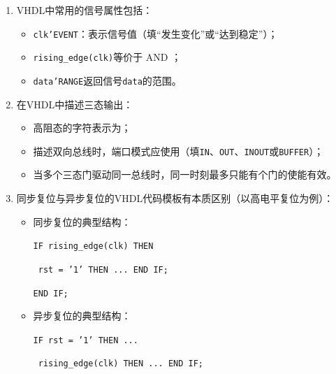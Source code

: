 \begin{enumerate}[label=\arabic*.]

\item VHDL中常用的信号属性包括：
\begin{itemize}
  \item \texttt{clk'EVENT}：表示信号值\underline{\hspace{3cm}}（填“发生变化”或“达到稳定”）；
  \item \texttt{rising\_edge(clk)}等价于\underline{\hspace{1.5cm}} AND \underline{\hspace{1.5cm}}；
  \item \texttt{data'RANGE}返回信号\texttt{data}的\underline{\hspace{2.5cm}}范围。
\end{itemize}

\vspace{0.5cm}

\item 在VHDL中描述三态输出：
\begin{itemize}
  \item 高阻态的字符表示为\underline{\hspace{1.5cm}}；
  \item 描述双向总线时，端口模式应使用\underline{\hspace{2cm}}（填\texttt{IN}、\texttt{OUT}、\texttt{INOUT}或\texttt{BUFFER}）；
  \item 当多个三态门驱动同一总线时，同一时刻最多只能有\underline{\hspace{1.5cm}}个门的使能有效。
\end{itemize}

\vspace{0.5cm}

\item 同步复位与异步复位的VHDL代码模板有本质区别（以高电平复位为例）：
\begin{itemize}
  \item 同步复位的典型结构：
  \par \texttt{IF rising\_edge(clk) THEN}
  \par \quad \texttt{\underline{\hspace{2cm}} rst = '1' THEN ... END IF;}
  \par \texttt{END IF;}
  \item 异步复位的典型结构：
  \par \texttt{IF rst = '1' THEN ...}
  \par \texttt{\underline{\hspace{2cm}} rising\_edge(clk) THEN ... END IF;}
\end{itemize}


\end{enumerate}
